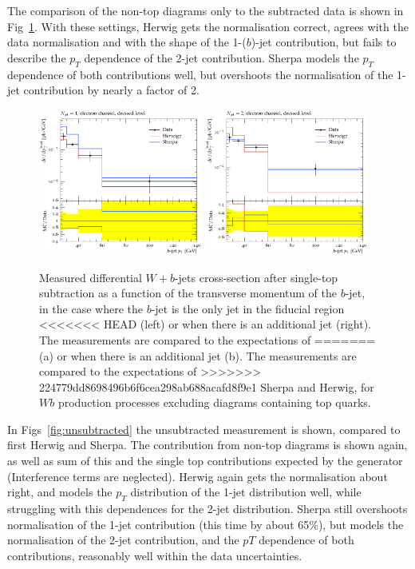 \documentclass[11pt]{cernrep}
\begin{document}
The comparison of the non-top diagrams only to the subtracted data is shown in Fig~\ref{fig:subtracted}. 
With these settings, Herwig gets the normalisation correct, agrees with the data normalisation and with
the shape of the 1-($b$)-jet contribution, but fails to describe the $p_T$ dependence of the 2-jet contribution.
Sherpa models the $p_T$ dependence of both contributions well, but overshoots the normalisation of the 1-jet
contribution by nearly a factor of 2.

\begin{figure}
\centering
	\includegraphics[width=0.48\textwidth]{subtracted_h7_s22-1jet.pdf}
	\includegraphics[width=0.48\textwidth]{subtracted_h7_s22-2jet.pdf}
\caption{\label{fig:subtracted}
  Measured differential $W+b$-jets cross-section after single-top subtraction as a function of the
  transverse momentum of the $b$-jet, in the case where the $b$-jet is the only jet in the fiducial region
<<<<<<< HEAD
  (left) or when there is an additional jet (right). The measurements are compared to the expectations of
=======
  (a) or when there is an additional jet (b). The measurements are compared to the expectations of
>>>>>>> 224779dd8698496b6f6cea298ab688acafd8f9e1
  Sherpa and Herwig, for $Wb$ production processes excluding diagrams containing top quarks.}
\end{figure}

In Figs~\ref{fig:unsubtracted} the unsubtracted measurement is shown, compared to first Herwig and Sherpa.
The contribution from non-top diagrams is shown again, as well as sum of this and the single top
contributions expected by the generator (Interference terms are neglected). Herwig again gets the
normalisation about right, and models the $p_T$ distribution of the 1-jet distribution well, while
struggling with this dependences for the 2-jet distribution. Sherpa still overshoots normalisation of
the 1-jet contribution (this time by about 65\%), but models the normalisation of the 2-jet contribution,
and the $pT$ dependence of both contributions, reasonably well within the data uncertainties.
\end{document}
